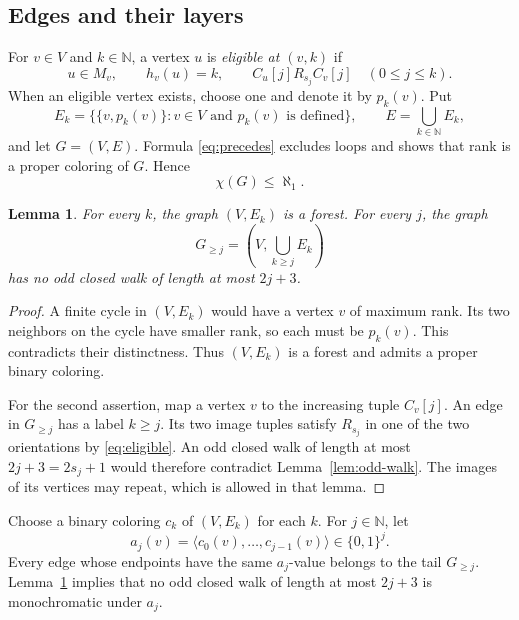 \documentclass[11pt,leqno]{amsart}
\newtheorem{lemma}[theorem]{Lemma}
\theoremstyle{definition}
\numberwithin{equation}{section}
\newcommand{\N}{\mathbb N}
\newcommand{\seq}[1]{\langle #1\rangle}
\begin{document}
\subsection{Edges and their layers}
For $v\in V$ and $k\in\N$, a vertex $u$ is \emph{eligible at $(v,k)$} if
\begin{equation}\label{eq:eligible}
u\in M_v,\qquad h_v(u)=k,\qquad
C_u[j]\mathrel{R_{s_j}}C_v[j]\quad(0\le j\le k).
\end{equation}
When an eligible vertex exists, choose one and denote it by $p_k(v)$. Put
\[
E_k=\bigl\{\{v,p_k(v)\}:v\in V\text{ and }p_k(v)\text{ is defined}\bigr\},
\qquad E=\bigcup_{k\in\N}E_k,
\]
and let $G=(V,E)$. Formula \eqref{eq:precedes} excludes loops and shows that rank is a proper coloring of $G$. Hence
\begin{equation}\label{eq:upper}
\chi(G)\le\aleph_1.
\end{equation}

\begin{lemma}\label{lem:layers}
For every $k$, the graph $(V,E_k)$ is a forest. For every $j$, the graph
\[
G_{\ge j}=\left(V,\bigcup_{k\ge j}E_k\right)
\]
has no odd closed walk of length at most $2j+3$.
\end{lemma}

\begin{proof}
A finite cycle in $(V,E_k)$ would have a vertex $v$ of maximum rank. Its two neighbors on the cycle have smaller rank, so each must be $p_k(v)$. This contradicts their distinctness. Thus $(V,E_k)$ is a forest and admits a proper binary coloring.

For the second assertion, map a vertex $v$ to the increasing tuple $C_v[j]$. An edge in $G_{\ge j}$ has a label $k\ge j$. Its two image tuples satisfy $R_{s_j}$ in one of the two orientations by \eqref{eq:eligible}. An odd closed walk of length at most $2j+3=2s_j+1$ would therefore contradict Lemma~\ref{lem:odd-walk}. The images of its vertices may repeat, which is allowed in that lemma.
\end{proof}

Choose a binary coloring $c_k$ of $(V,E_k)$ for each $k$. For $j\in\N$, let
\begin{equation}\label{eq:finite-coloring}
a_j(v)=\seq{c_0(v),\ldots,c_{j-1}(v)}\in\{0,1\}^{j}.
\end{equation}
Every edge whose endpoints have the same $a_j$-value belongs to the tail $G_{\ge j}$. Lemma~\ref{lem:layers} implies that no odd closed walk of length at most $2j+3$ is monochromatic under $a_j$.
\end{document}
